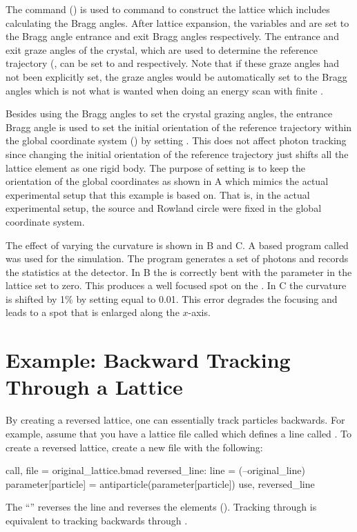 The  command () is used to command \bmad to construct the
lattice which includes calculating the Bragg angles. After lattice expansion, the variables
 and  are set to the Bragg angle entrance and exit Bragg angles
respectively. The entrance and exit graze angles of the crystal, which are used to determine the
reference trajectory (, can be set to  and  respectively. Note that if these graze angles had not been explicitly set, the graze angles
would be automatically set to the Bragg angles which
is not what is wanted when doing an energy scan with finite .

Besides using the Bragg angles to set the crystal grazing angles, the entrance Bragg angle is used
to set the initial orientation of the reference trajectory within the global coordinate system
() by setting . This does not affect photon tracking since
changing the initial orientation of the reference trajectory just shifts all the lattice element as
one rigid body. The purpose of setting  is to keep the orientation of the
global coordinates as shown in A which mimics the actual experimental setup that this
example is based on. That is, in the actual experimental setup, the source and Rowland circle were
fixed in the global coordinate system.

The effect of varying the  curvature is shown in B and
C. A \bmad based program called  was used for the simulation. The 
program generates a set of photons and records the statistics at the detector. In B
the  is correctly bent with the parameter  in the lattice set to zero. This
produces a well focused spot on the . In C the  curvature
is shifted by 1\% by setting  equal to 0.01. This error degrades the focusing and leads to a
spot that is enlarged along the $x$-axis.


\section{Example: Backward Tracking Through a Lattice}
\label{s:reverse}

By creating a reversed lattice, one can essentially track particles backwards. For example,
assume that you have a lattice file called  which defines a line
called . To create a reversed lattice, create a new file with the following:
\begin{example}
  call, file = original_lattice.bmad
  reversed_line: line = (--original_line)
  parameter[particle] = antiparticle(parameter[particle])
  use, reversed_line
\end{example}
The ``\vn{--}'' reverses the line and reverses the elements (). Tracking through
 is equivalent to tracking backwards through .  

